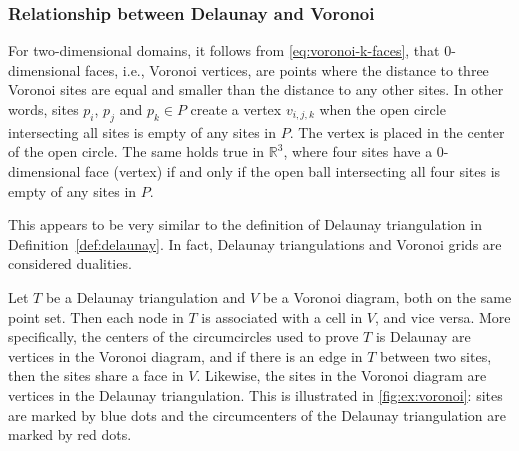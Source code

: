 \subsubsection{Relationship between Delaunay and Voronoi}
For two-dimensional domains, it follows from \autoref{eq:voronoi-k-faces}, that 0-dimensional faces, i.e., Voronoi vertices, are points where the distance to three Voronoi sites are equal and smaller than the distance to any other sites. In other words, sites $p_i$, $p_j$ and $p_k \in P$ create a vertex $v_{i, j, k}$ when the open circle intersecting all sites is empty of any sites in $P$. The vertex is placed in the center of the open circle. The same holds true in $\mathbb{R}^3$, where four sites have a 0-dimensional face (vertex) if and only if the open ball intersecting all four sites is empty of any sites in $P$.

This appears to be very similar to the definition of Delaunay triangulation in Definition~\ref{def:delaunay}. In fact, Delaunay triangulations and Voronoi grids are considered dualities.


Let $T$ be a Delaunay triangulation and $V$ be a Voronoi diagram, both on the same point set. Then each node in $T$ is associated with a cell in $V$, and vice versa. More specifically, the centers of the circumcircles used to prove $T$ is Delaunay are vertices in the Voronoi diagram, and if there is an edge in $T$ between two sites, then the sites share a face in $V$. Likewise, the sites in the Voronoi diagram are vertices in the Delaunay triangulation. This is illustrated in \autoref{fig:ex:voronoi}: sites are marked by blue dots and the circumcenters of the Delaunay triangulation are marked by red dots.


